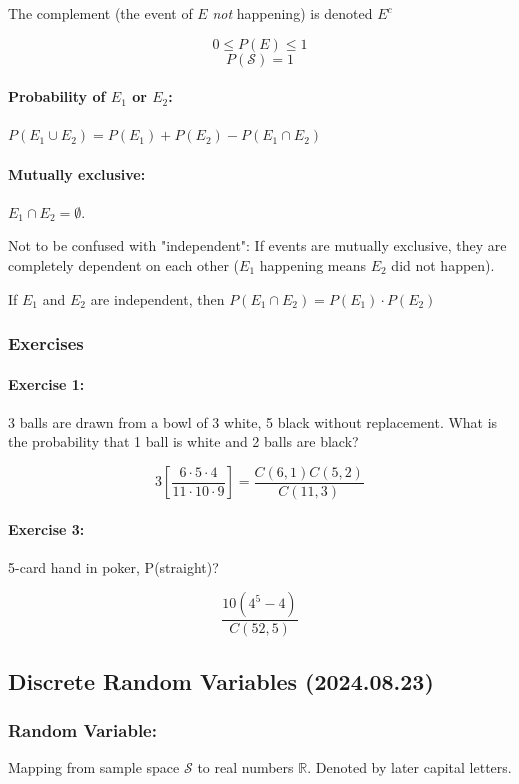 \documentclass[12pt]{article}
\begin{document}
The complement (the event of $E$ \textit{not} happening) is denoted $E^c$

\[0 \le P(E) \le 1\]
\[P(\mathcal{S}) = 1\]

\paragraph{Probability of $E_1$ or $E_2$:}
$P(E_1 \cup E_2) = P(E_1) + P(E_2) - P(E_1 \cap E_2)$

\paragraph{Mutually exclusive:}
$E_1 \cap E_2 = \emptyset$.

Not to be confused with "independent": If events are mutually exclusive, they are completely dependent on each other ($E_1$ happening means $E_2$ did not happen).

If $E_1$ and $E_2$ are independent, then $P(E_1 \cap E_2) = P(E_1) \cdot P(E_2)$

\subsubsection{Exercises}

\paragraph{Exercise 1:}
3 balls are drawn from a bowl of 3 white, 5 black without replacement. What is the probability that 1 ball is white and 2 balls are black?

\[
3 \left[\frac{6\cdot 5 \cdot 4}{11 \cdot 10 \cdot 9}\right] = \frac{C(6, 1) C(5,2)}{C (11, 3)}
\]

\paragraph{Exercise 3:}
5-card hand in poker, P(straight)?

\[\frac{10\left(4^5 - 4\right)}{C(52,5)}\]

\subsection{Discrete Random Variables (2024.08.23)}
\subsubsection{Random Variable:} 
Mapping from sample space $\mathcal{S}$ to real numbers $\mathbb{R}$. Denoted by later capital letters.
\end{document}
